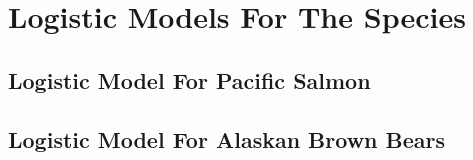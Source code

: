 \documentclass{CPP}
\begin{document}

% 


% 


% 


% 


\chapter{Logistic Models For The Species}




% 

\section{Logistic Model For Pacific Salmon}



\section{Logistic Model For Alaskan Brown Bears}
\end{document}
